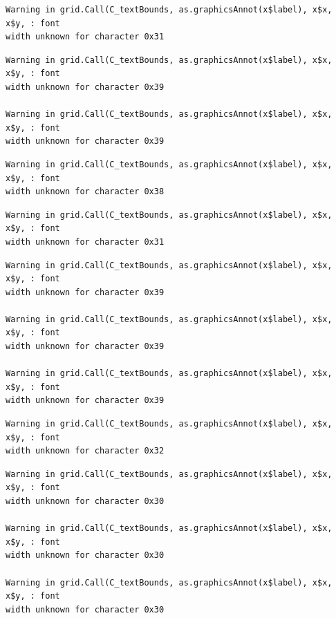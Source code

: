 \documentclass[
  letterpaper,
  DIV=11,
  numbers=noendperiod]{scrreprt}
\begin{document}
\begin{verbatim}
Warning in grid.Call(C_textBounds, as.graphicsAnnot(x$label), x$x, x$y, : font
width unknown for character 0x31
\end{verbatim}

\begin{verbatim}
Warning in grid.Call(C_textBounds, as.graphicsAnnot(x$label), x$x, x$y, : font
width unknown for character 0x39

Warning in grid.Call(C_textBounds, as.graphicsAnnot(x$label), x$x, x$y, : font
width unknown for character 0x39
\end{verbatim}

\begin{verbatim}
Warning in grid.Call(C_textBounds, as.graphicsAnnot(x$label), x$x, x$y, : font
width unknown for character 0x38
\end{verbatim}

\begin{verbatim}
Warning in grid.Call(C_textBounds, as.graphicsAnnot(x$label), x$x, x$y, : font
width unknown for character 0x31
\end{verbatim}

\begin{verbatim}
Warning in grid.Call(C_textBounds, as.graphicsAnnot(x$label), x$x, x$y, : font
width unknown for character 0x39

Warning in grid.Call(C_textBounds, as.graphicsAnnot(x$label), x$x, x$y, : font
width unknown for character 0x39

Warning in grid.Call(C_textBounds, as.graphicsAnnot(x$label), x$x, x$y, : font
width unknown for character 0x39
\end{verbatim}

\begin{verbatim}
Warning in grid.Call(C_textBounds, as.graphicsAnnot(x$label), x$x, x$y, : font
width unknown for character 0x32
\end{verbatim}

\begin{verbatim}
Warning in grid.Call(C_textBounds, as.graphicsAnnot(x$label), x$x, x$y, : font
width unknown for character 0x30

Warning in grid.Call(C_textBounds, as.graphicsAnnot(x$label), x$x, x$y, : font
width unknown for character 0x30

Warning in grid.Call(C_textBounds, as.graphicsAnnot(x$label), x$x, x$y, : font
width unknown for character 0x30
\end{verbatim}
\end{document}
